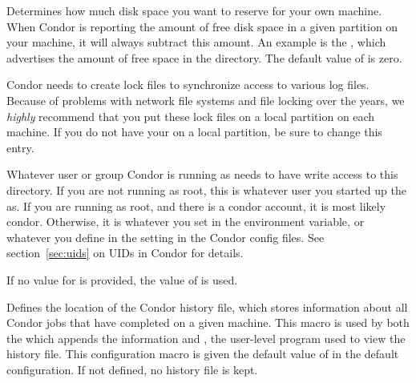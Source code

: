 \begin{description}
\label{param:ReservedDisk}
\item[\Macro{RESERVED\_DISK}]
  Determines how much disk space you want to reserve for your own machine.
  When Condor is reporting the amount of free disk space in a given
  partition on your machine, it will always subtract this amount.  An
  example is the , which advertises the amount of free
  space in the  directory.  The default value of
   is zero.
  
\label{param:Lock}
\item[\Macro{LOCK}]
  Condor needs to create
  lock files to synchronize access to various log files.  Because of
  problems with network file systems and file locking over
  the years, we \emph{highly} recommend that you put these lock
  files on a local partition on each machine.  If you do not have your
   on a local partition, be sure to change this
  entry.

  Whatever user or group Condor is running as needs to have
  write access to this directory.  If you are not running as root, this
  is whatever user you started up the  as.  If you are
  running as root, and there is a condor account, it is most
  likely condor.
  Otherwise, it is whatever you set in the 
  environment variable, or whatever you define in the
   setting in the Condor config files.
  See section~\ref{sec:uids} on UIDs in Condor for details.

  If no value for  is provided, the value of 
  is used.


\label{param:History}
\item[\Macro{HISTORY}]
  Defines the
  location of the Condor history file, which stores information about
  all Condor jobs that have completed on a given machine.  This macro
  is used by both the  which appends the information
  and , the user-level program used to view
  the history file.
  This configuration macro is given the default value of
   in the default configuration.
  If not defined,
  no history file is kept.


\end{description}
